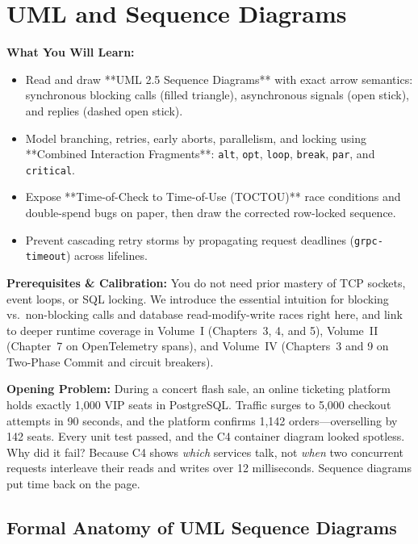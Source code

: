 \chapter{UML and Sequence Diagrams}
\label{chap:uml}

\begin{chaptergoalsbox}
\textbf{What You Will Learn:}
\begin{itemize}[leftmargin=12pt]
  \item Read and draw **UML 2.5 Sequence Diagrams** with exact arrow semantics: synchronous blocking calls (filled triangle), asynchronous signals (open stick), and replies (dashed open stick).
  \item Model branching, retries, early aborts, parallelism, and locking using **Combined Interaction Fragments**: \texttt{alt}, \texttt{opt}, \texttt{loop}, \texttt{break}, \texttt{par}, and \texttt{critical}.
  \item Expose **Time-of-Check to Time-of-Use (TOCTOU)** race conditions and double-spend bugs on paper, then draw the corrected row-locked sequence.
  \item Prevent cascading retry storms by propagating request deadlines (\texttt{grpc-timeout}) across lifelines.
\end{itemize}

\textbf{Prerequisites \& Calibration:}
You do not need prior mastery of TCP sockets, event loops, or SQL locking. We introduce the essential intuition for blocking vs.\ non-blocking calls and database read-modify-write races right here, and link to deeper runtime coverage in Volume~I (Chapters~3, 4, and 5), Volume~II (Chapter~7 on OpenTelemetry spans), and Volume~IV (Chapters~3 and 9 on Two-Phase Commit and circuit breakers).

\textbf{Opening Problem:}
During a concert flash sale, an online ticketing platform holds exactly 1,000 VIP seats in PostgreSQL. Traffic surges to 5,000 checkout attempts in 90 seconds, and the platform confirms 1,142 orders---overselling by 142 seats. Every unit test passed, and the C4 container diagram looked spotless. Why did it fail? Because C4 shows \emph{which} services talk, not \emph{when} two concurrent requests interleave their reads and writes over 12 milliseconds. Sequence diagrams put time back on the page.
\end{chaptergoalsbox}

\section{Formal Anatomy of UML Sequence Diagrams}

